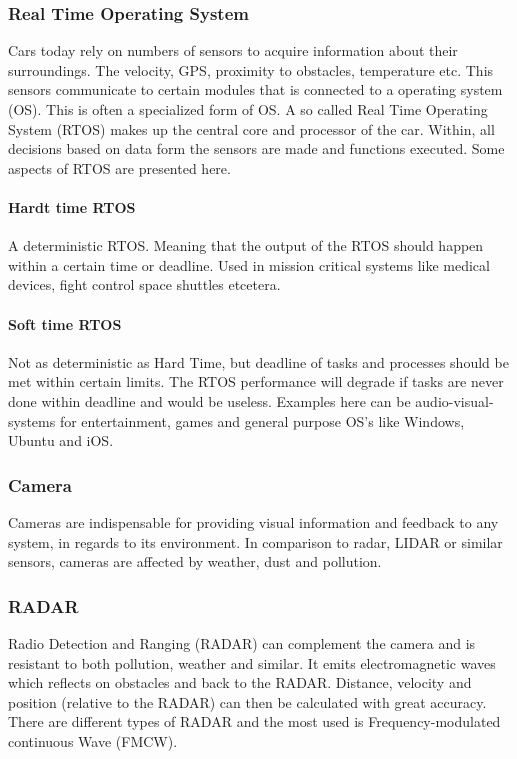 \documentclass[conference]{IEEEtran}
\begin{document}
	 \subsubsection{Real Time Operating System}
		 Cars today rely on numbers of sensors to acquire information about their surroundings.
		 The velocity, GPS, proximity to obstacles, temperature etc. This sensors communicate to certain
		 modules that is connected to a operating system (OS). This is often a specialized form
		 of OS. A so called Real Time Operating System (RTOS) makes up the central core and processor
		 of the car. Within, all decisions based on data form the sensors are made and functions
		 executed. Some aspects of RTOS are presented here.\cite{Wiki:RTOS}

		 \paragraph{Hardt time RTOS}
		 A deterministic RTOS. Meaning that the output of the RTOS should happen within a certain
		 time or deadline. Used in mission critical systems like medical devices, fight control
		 space shuttles etcetera.

		 \paragraph{Soft time RTOS}
		 Not as deterministic as Hard Time, but deadline of tasks and processes should be met within
		 certain limits. The RTOS performance will degrade if tasks are never done within deadline and
		 would be useless. Examples here can be audio-visual-systems for entertainment, games and general purpose
		 OS's like Windows, Ubuntu and iOS.
	 \subsubsection{Camera}
		 Cameras are indispensable for providing visual information and feedback to any system,
		 in regards to its environment. In comparison to radar, LIDAR or similar sensors,
		 cameras are affected by weather, dust and pollution.
	 \subsubsection{RADAR}
		 Radio Detection and Ranging (RADAR) can complement the camera and is resistant to both
		 pollution, weather and similar. It emits electromagnetic waves which reflects on obstacles
		 and back to the RADAR. Distance, velocity and position (relative to the RADAR) can then
		 be calculated with great accuracy. There are different types of RADAR and the most used
		 is Frequency-modulated continuous Wave (FMCW).\cite{Wiki:RADAR}
\end{document}
